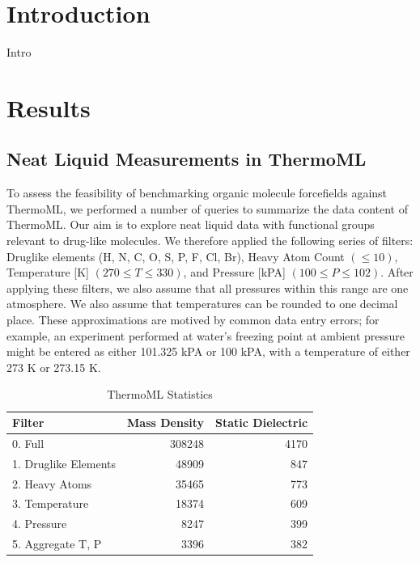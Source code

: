 \documentclass[aps,pre,twocolumn,superscriptaddress]{revtex4-1}
\begin{document}
\section{Introduction}

Intro

\section{Results}

\subsection{Neat Liquid Measurements in ThermoML}

To assess the feasibility of benchmarking organic molecule forcefields against ThermoML, we performed a number of queries to summarize the data content of ThermoML.  Our aim is to explore neat liquid data with functional groups relevant to drug-like molecules.  We therefore applied the following series of filters: Druglike elements (H, N, C, O, S, P, F, Cl, Br), Heavy Atom Count $(\le 10)$, Temperature [K] $(270 \le T \le 330)$, and Pressure [kPA] $(100 \le P \le 102)$.  After applying these filters, we also assume that all pressures within this range are one atmosphere.  We also assume that temperatures can be rounded to one decimal place.  These approximations are motived by common data entry errors; for example, an experiment performed at water's freezing point at ambient pressure might be entered as either 101.325 kPA or 100 kPA, with a temperature of either 273 K or 273.15 K.

\begin{table}
\begin{tabular}{lrr}
\toprule
Filter &  Mass Density &  Static Dielectric \\
\midrule
0.  Full              &               308248 &                                     4170 \\
1.  Druglike Elements &                48909 &                                      847 \\
2.  Heavy Atoms       &                35465 &                                      773 \\
3.  Temperature       &                18374 &                                      609 \\
4.  Pressure          &                 8247 &                                      399 \\
5.  Aggregate T, P    &                 3396 &                                      382 \\
\bottomrule
\end{tabular}
\label{Table:Measurements}
\caption{ThermoML Statistics}
\end{table}
\end{document}
